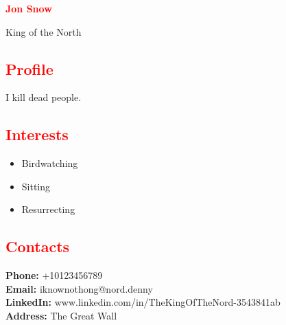 \documentclass[a4paper,11pt]{article}
\begin{document}
\begin{center}
    {\Huge \textbf{\textcolor{red}{Jon Snow}}}
\end{center}

\begin{tcolorbox}[colframe=white,colback=red!75!green!50,arc=3pt,boxrule=0pt]
    King of the North
\end{tcolorbox}

\vspace{0.5cm}

\noindent
\begin{minipage}[t]{0.3\textwidth}
    \textcolor{red}{\section*{Profile}} 
    I kill dead people.

    \textcolor{red}{\section*{Interests}} 
    \begin{itemize}
        \item Birdwatching
        \item Sitting
        \item Resurrecting
    \end{itemize}

    \textcolor{red}{\section*{Contacts}}
    \textbf{Phone:} +10123456789 \\
    \textbf{Email:} iknownothong@nord.denny \\
    \textbf{LinkedIn:} www.linkedin.com/in/TheKingOfTheNord-3543841ab \\
    \textbf{Address:} The Great Wall
\end{minipage}%
\hspace{1cm}\vrule\hspace{1cm}%
\end{document}
